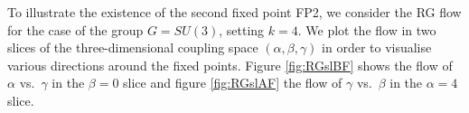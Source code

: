 \documentclass[12pt]{article}
\begin{document}
To illustrate the existence of the second fixed point FP2, we consider the RG flow for the case of  the group $G=SU(3)$, setting $k=4$. We plot the flow in two slices of the three-dimensional coupling space $(\alpha,\beta,\gamma)$ in order to visualise various directions around the fixed points. Figure \ref{fig:RGslBF} shows the flow of $\alpha$ vs.\ $\gamma$ in the $\beta=0$ slice and figure \ref{fig:RGslAF} the flow of $\gamma$ vs.\ $\beta$ in the $\alpha=4$ slice. \\


%
\end{document}
